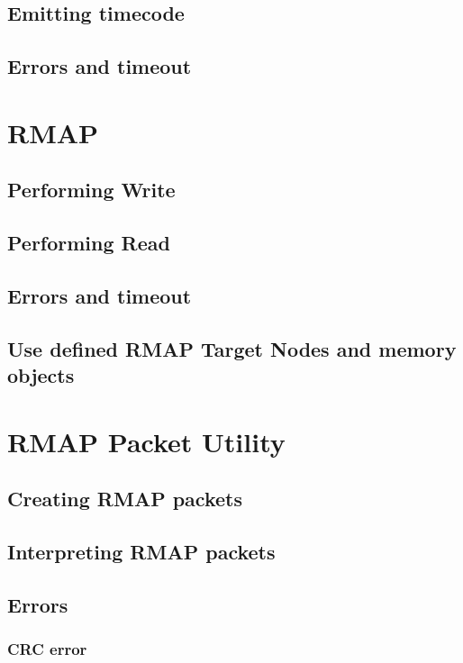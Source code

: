 \documentclass[a4paper,10pt]{article}
\begin{document}
\subsection{Emitting timecode}
\subsection{Errors and timeout}

\section{RMAP}
\subsection{Performing Write}
\subsection{Performing Read}
\subsection{Errors and timeout}
\subsection{Use defined RMAP Target Nodes and memory objects}


\section{RMAP Packet Utility}
\subsection{Creating RMAP packets}
\subsection{Interpreting RMAP packets}
\subsection{Errors}
\subsubsection{CRC error}
\end{document}
